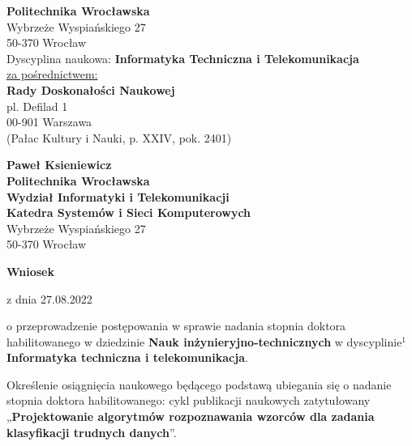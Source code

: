 \newpage
\thispagestyle{empty}
\begin{fullwidth}
	
\hspace{.75\textwidth}
\begin{minipage}{.65\textwidth}
\textbf{Politechnika Wrocławska}\\
Wybrzeże Wyspiańskiego 27\\
50-370 Wrocław\\
Dyscyplina naukowa: \textbf{Informatyka Techniczna i Telekomunikacja}\\
\underline{za pośrednictwem:}\\
\textbf{Rady Doskonałości Naukowej}\\
pl. Defilad 1\\
00-901 Warszawa\\
(Pałac Kultury i Nauki, p. XXIV, pok. 2401)
\end{minipage}

\noindent\begin{minipage}{.75\textwidth}
\textbf{Paweł Ksieniewicz}\\
\textbf{Politechnika Wrocławska}\\
\textbf{Wydział Informatyki i Telekomunikacji}\\
\textbf{Katedra Systemów i Sieci Komputerowych}\\
Wybrzeże Wyspiańskiego 27\\
50-370 Wrocław
\end{minipage}
\vspace{1em}

\begin{center}
	{\textbf{\large Wniosek}}
	
	z dnia 27.08.2022	
\end{center}

o przeprowadzenie postępowania w sprawie nadania stopnia doktora habilitowanego w dziedzinie \textbf{Nauk inżynieryjno-technicznych} w dyscyplinie$^1$ \textbf{Informatyka techniczna i telekomunikacja}.\vspace{1em}

\hspace{3em}\begin{minipage}{45em}
Określenie osiągnięcia naukowego będącego podstawą ubiegania się o nadanie stopnia doktora habilitowanego: cykl publikacji naukowych zatytułowany „\textbf{Projektowanie algorytmów rozpoznawania wzorców dla zadania klasyfikacji trudnych danych}”.
\end{minipage}\vspace{1em}


\end{fullwidth}
